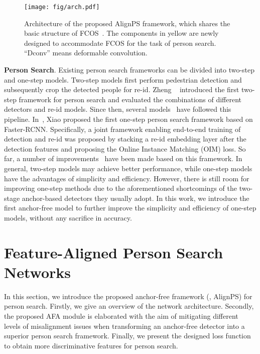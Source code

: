 \documentclass[final]{cvpr}
\begin{document}
\begin{figure*}[t]
\setlength{\abovecaptionskip}{1mm}
\centering
\texttt{[image: fig/arch.pdf]}
\caption{Architecture of the proposed AlignPS framework, which shares the basic structure of FCOS~\cite{DBLP:conf/iccv/TianSCH19}. The components in yellow are newly designed to accommodate FCOS for the task of person search. ``Dconv'' means deformable convolution.}\label{fig:arch}
\vspace{-2mm}
\end{figure*}

\textbf{Person Search}. Existing person search frameworks can be divided into two-step and one-step models. Two-step models first perform pedestrian detection and subsequently crop the detected people for re-id. Zheng \etal~\cite{DBLP:conf/cvpr/ZhengZSCYT17} introduced the first two-step framework for person search and evaluated the combinations of different detectors and re-id models. Since then, several models~\cite{DBLP:conf/eccv/ChenZOYT18,DBLP:conf/eccv/LanZG18,DBLP:conf/iccv/HanYZTZGS19,DBLP:conf/cvpr/WangMCSC20} have followed this pipeline. In~\cite{DBLP:conf/cvpr/XiaoLWLW17}, Xiao \etal proposed the first one-step person search framework based on Faster-RCNN. Specifically, a joint framework enabling end-to-end training of detection and re-id was proposed by stacking a re-id embedding layer after the detection features and proposing the Online Instance Matching (OIM) loss. So far, a number of improvements~\cite{DBLP:conf/iccv/LiuFJKZQJY17,DBLP:journals/pr/XiaoXTHWF19,DBLP:conf/eccv/ChangHSLYH18,DBLP:conf/cvpr/YanZNZXY19,DBLP:conf/cvpr/MunjalATG19,DBLP:conf/cvpr/DongZST20a,DBLP:conf/cvpr/ChenZYS20} have been made based on this framework. In general, two-step models may achieve better performance, while one-step models have the advantages of simplicity and efficiency. However, there is still room for improving one-step methods due to the aforementioned shortcomings of the two-stage anchor-based detectors they usually adopt. In this work, we introduce the first anchor-free model to further improve the simplicity and efficiency of one-step models, without any sacrifice in accuracy. 

\section{Feature-Aligned Person Search Networks}
In this section, we introduce the proposed anchor-free framework (\ie, AlignPS) for person search. Firstly, we give an overview of the network architecture. Secondly, the proposed AFA module is elaborated with the aim of mitigating different levels of misalignment issues when transforming an anchor-free detector into a superior person search framework. Finally, we present the designed loss function to obtain more discriminative features for person search.
\end{document}
